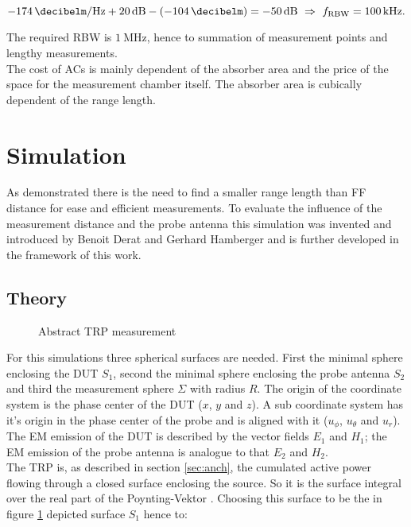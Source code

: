 \begin{equation}
\SI{-174}{\decibelm\per\hertz}+\SI{20}{\decibel}-\left(\SI{-104}{\decibelm}\right)=\SI{-50}{\decibel}\ \Rightarrow\ f_{\text{RBW}}=\SI{100}{\kilo\hertz}.
\end{equation}

The required \ac{RBW} is $\SI{1}{\mega\hertz}$, hence to summation of measurement points and lengthy measurements.\\
The cost of \acp{AC} is mainly dependent of the absorber area and the price of the space for the measurement chamber itself. The absorber area is cubically dependent of the range length.
\section{Simulation}

As demonstrated there is the need to find a smaller range length than \ac{FF} distance for ease and efficient measurements. To evaluate the influence of the measurement distance and the probe antenna this simulation was invented and introduced by Benoit Derat and Gerhard Hamberger \cite{mypaper} and is further developed in the framework of this work.

\subsection{Theory}

\begin{figure}[h]
\centering
\def\svgwidth{0.5\textwidth}

\caption{Abstract TRP measurement}
\label{fig:trpmeas}
\end{figure}

For this simulations three spherical surfaces are needed. First the minimal sphere enclosing the \ac{DUT} $S_1$, second the minimal sphere enclosing the probe antenna $S_2$ and third the measurement sphere $\Sigma$ with radius $R$. The origin of the coordinate system is the phase center of the \ac{DUT} ($x$, $y$ and $z$). A sub coordinate system has it's origin in the phase center of the probe and is aligned with it ($u_\phi$, $u_\theta$ and $u_r$). The \ac{EM} emission of the \ac{DUT} is described by the vector fields $E_1$ and $H_1$; the \ac{EM} emission of the probe antenna is analogue to that $E_2$ and $H_2$.\\
The \ac{TRP} is, as described in section \ref{sec:anch}, the cumulated active power flowing through a closed surface enclosing the source. So it is the surface integral over the real part of the Poynting-Vektor \cite{mypaper}. Choosing this surface to be the in figure \ref{fig:trpmeas} depicted surface $S_1$ hence to:

